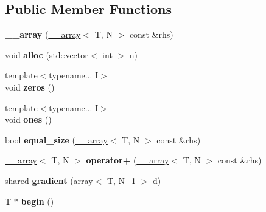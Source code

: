 \subsection*{Public Member Functions}
\begin{DoxyCompactItemize}
\item 
\hypertarget{class____array_ac3443fee161fd3f8ccb1290980a4190d}{{\bfseries \-\_\-\-\_\-array} (\hyperlink{class____array}{\-\_\-\-\_\-array}$<$ T, N $>$ const \&rhs)}\label{class____array_ac3443fee161fd3f8ccb1290980a4190d}

\item 
\hypertarget{class____array_a0ffa8a127e271c2ae60c705e5baaf6d1}{void {\bfseries alloc} (std\-::vector$<$ int $>$ n)}\label{class____array_a0ffa8a127e271c2ae60c705e5baaf6d1}

\item 
\hypertarget{class____array_aa96312fd6a92af3661cfe7c4c96768d6}{{\footnotesize template$<$typename... I$>$ }\\void {\bfseries zeros} ()}\label{class____array_aa96312fd6a92af3661cfe7c4c96768d6}

\item 
\hypertarget{class____array_a4a69efe5b113660c08fd598932836272}{{\footnotesize template$<$typename... I$>$ }\\void {\bfseries ones} ()}\label{class____array_a4a69efe5b113660c08fd598932836272}

\item 
\hypertarget{class____array_accc02e65ce775d472554778825ebdeda}{bool {\bfseries equal\-\_\-size} (\hyperlink{class____array}{\-\_\-\-\_\-array}$<$ T, N $>$ const \&rhs)}\label{class____array_accc02e65ce775d472554778825ebdeda}

\item 
\hypertarget{class____array_a435566ff4cab00684e41335595b4c60c}{\hyperlink{class____array}{\-\_\-\-\_\-array}$<$ T, N $>$ {\bfseries operator+} (\hyperlink{class____array}{\-\_\-\-\_\-array}$<$ T, N $>$ const \&rhs)}\label{class____array_a435566ff4cab00684e41335595b4c60c}

\item 
\hypertarget{class____array_aa34252173164544a96d1f2e0fa2875e3}{shared {\bfseries gradient} (array$<$ T, N+1 $>$ d)}\label{class____array_aa34252173164544a96d1f2e0fa2875e3}

\item 
\hypertarget{class____array_a9e073ed33e0fad10acbbb001af3c10b1}{T $\ast$ {\bfseries begin} ()}\label{class____array_a9e073ed33e0fad10acbbb001af3c10b1}


\end{DoxyCompactItemize}
